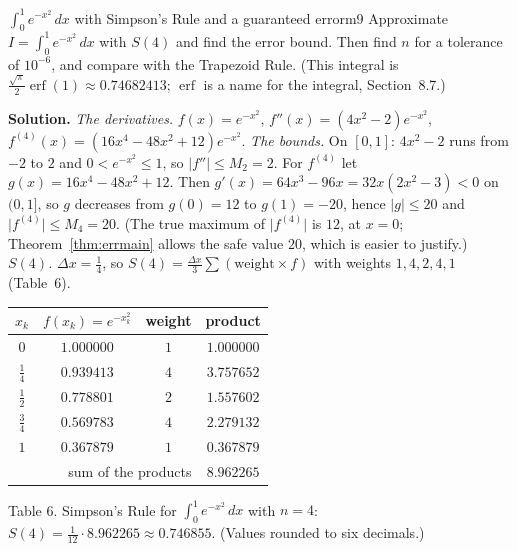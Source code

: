 \documentclass[11pt]{article}
\begin{document}
\begin{exmp}{$\int_0^1e^{-x^2}\,dx$ with Simpson's Rule and a guaranteed error}{m9}
Approximate $I=\int_0^1e^{-x^2}\,dx$ with $S(4)$ and find the error bound. Then find $n$ for a tolerance of $10^{-6}$, and compare with the Trapezoid Rule. (This integral is $\frac{\sqrt\pi}2\operatorname{erf}(1)\approx0.74682413$; $\operatorname{erf}$ is a name for the integral, Section~8.7.)

\textbf{Solution.} \emph{The derivatives.} $f(x)=e^{-x^2}$, $f''(x)=(4x^2-2)e^{-x^2}$, $f^{(4)}(x)=(16x^4-48x^2+12)e^{-x^2}$.
\emph{The bounds.} On $[0,1]$: $4x^2-2$ runs from $-2$ to $2$ and $0<e^{-x^2}\le1$, so $\lvert f''\rvert\le M_2=2$. For $f^{(4)}$ let $g(x)=16x^4-48x^2+12$. Then $g'(x)=64x^3-96x=32x(2x^2-3)<0$ on $(0,1]$, so $g$ decreases from $g(0)=12$ to $g(1)=-20$, hence $\lvert g\rvert\le20$ and $\lvert f^{(4)}\rvert\le M_4=20$. (The true maximum of $\lvert f^{(4)}\rvert$ is $12$, at $x=0$; Theorem~\ref{thm:errmain} allows the safe value $20$, which is easier to justify.)
\emph{$S(4)$.} $\Delta x=\frac14$, so $S(4)=\frac{\Delta x}3\sum(\text{weight}\times f)$ with weights $1,4,2,4,1$ (Table~6).
\begin{center}
\begin{tabular}{cccc}
\toprule $x_k$ & $f(x_k)=e^{-x_k^2}$ & weight & product\\\midrule
$0$ & $1.000000$ & $1$ & $1.000000$\\
$\frac14$ & $0.939413$ & $4$ & $3.757652$\\
$\frac12$ & $0.778801$ & $2$ & $1.557602$\\
$\frac34$ & $0.569783$ & $4$ & $2.279132$\\
$1$ & $0.367879$ & $1$ & $0.367879$\\\midrule
\multicolumn{3}{r}{sum of the products} & $8.962265$\\\bottomrule
\end{tabular}
\end{center}
\begin{center}\small Table 6. Simpson's Rule for $\int_0^1e^{-x^2}\,dx$ with $n=4$: $S(4)=\frac1{12}\cdot8.962265\approx0.746855$. (Values rounded to six decimals.)\end{center}

\end{exmp}
\end{document}
